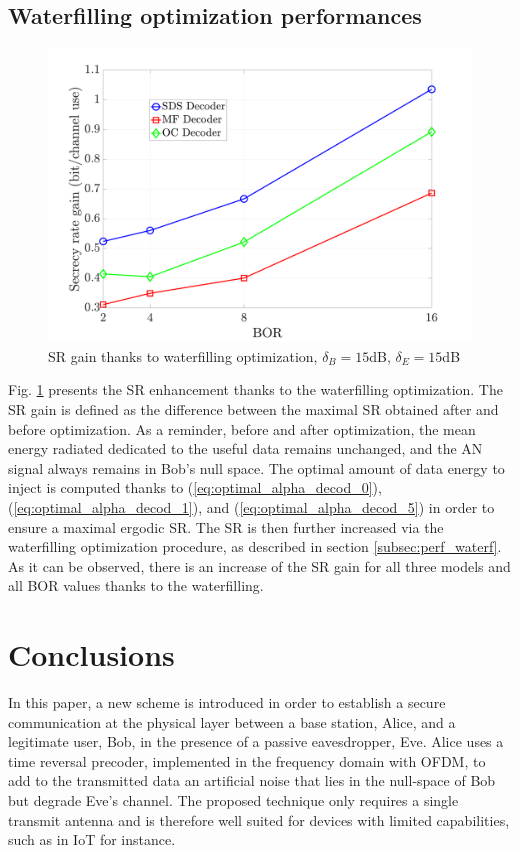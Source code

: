 \documentclass[12pt, draftclsnofoot, onecolumn]{IEEEtran}
\let\MYoriglatexcaption\caption
\renewcommand{\caption}[2][\relax]{\MYoriglatexcaption[#2]{#2}}
\begin{document}
\subsection{Waterfilling optimization performances}
\begin{figure}[h!t]
	\centering
	\includegraphics[width=0.6\linewidth]{graphs/SR_gain.pdf}
	\caption{SR gain thanks to waterfilling optimization, $\delta_B  = 15$dB, $\delta_E = 15$dB}
	\label{fig_waterfilling_opt}
\end{figure}
Fig. \ref{fig_waterfilling_opt} presents the SR enhancement thanks to the waterfilling optimization. The SR gain is defined as the difference between the maximal SR obtained after and before optimization. As a reminder, before and after optimization, the mean energy radiated dedicated to the useful data remains unchanged, and the AN signal always remains in Bob's null space. The optimal amount of data energy to inject is computed thanks to (\ref{eq:optimal_alpha_decod_0}), (\ref{eq:optimal_alpha_decod_1}), and (\ref{eq:optimal_alpha_decod_5}) in order to ensure a maximal ergodic SR. The SR is then further increased via the waterfilling optimization procedure, as described in section \ref{subsec:perf_waterf}. As it can be observed, there is an increase of the SR gain for all three models and all BOR values thanks to the waterfilling. 

\section{Conclusions}\label{sec:conclusions}
In this paper, a new scheme is introduced in order to establish a secure communication at the physical layer between a base station, Alice, and a legitimate user, Bob, in the presence of a passive eavesdropper, Eve. Alice uses a time reversal precoder, implemented in the frequency domain with OFDM, to add to the transmitted data an artificial noise that lies in the null-space of Bob but degrade Eve’s channel. The proposed technique only requires a single transmit antenna and is therefore well suited for devices with limited capabilities, such as in IoT for instance. 
\end{document}
